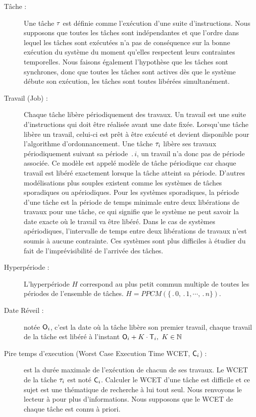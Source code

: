 \begin{description}
\item[Tâche :] Une tâche $\tau_{}$ est définie comme l’exécution
  d’une suite d’instructions. Nous supposons que toutes les tâches
  sont indépendantes et que l’ordre dans lequel les tâches sont
  exécutées n’a pas de conséquence sur la bonne exécution du système
  du moment qu’elles respectent leurs contraintes temporelles. Nous
  faisons également l’hypothèse que les tâches sont synchrones, donc
  que toutes les tâches sont actives dès que le système débute son
  exécution, les tâches sont toutes libérées simultanément.
  
\item[Travail (Job) :] Chaque tâche libère périodiquement des
  travaux. Un travail est une suite d’instructions qui doit être
  réalisée avant une date fixée. Lorsqu’une tâche libère un travail,
  celui-ci est prêt à être exécuté et devient disponible pour
  l’algorithme d’ordonnancement. Une tâche $\tau_{i}$ libère ses
  travaux périodiquement suivant sa période $\period{i}$, un travail
  n’a donc pas de période associée. Ce modèle est appelé modèle de
  tâche périodique car chaque travail est libéré exactement lorsque la
  tâche atteint sa période. D’autres modélisations plus souples
  existent comme les systèmes de tâches sporadiques ou
  apériodiques. Pour les systèmes sporadiques, la période d’une tâche
  est la période de temps minimale entre deux libérations de travaux
  pour une tâche, ce qui signifie que le système ne peut savoir la
  date exacte où le travail va être libéré. Dans le cas de systèmes
  apériodiques, l’intervalle de temps entre deux libérations de
  travaux n’est soumis à aucune contrainte. Ces systèmes sont plus
  difficiles à étudier du fait de l’imprévisibilité de l’arrivée des
  tâches.
\item[Hyperpériode :] L’hyperpériode $H$ correspond au plus petit
  commun multiple de toutes les périodes de l’ensemble de tâches.  $H
  = PPCM(\{\period{0},\period{1},\cdots,\period{n}\})$.

\item[Date Réveil :] notée $\mathsf{O}_{i}$, c’est la date où la t\^ache
  libère son premier travail, chaque travail de la tâche est libéré à
  l’instant $\mathsf{O}_{i} + K \cdot \mathsf{T}_{i}, ~K \in \mathbb{N}$
\item[Pire temps d’execution (Worst Case Execution Time WCET,
  $\mathsf{C}_{i}$) :] est la durée maximale de l’exécution de chacun de
  ses travaux. Le WCET de la tâche $\tau_{i}$ est noté
  $\mathsf{C}_{i}$. Calculer le WCET d’une tâche est difficile et ce sujet
  est une thématique de recherche à lui tout seul. Nous renvoyons le
  lecteur à \cite{WEE+08} pour plus d’informations. Nous supposons que
  le WCET de chaque t\^ache est connu à priori.
  

\end{description}
